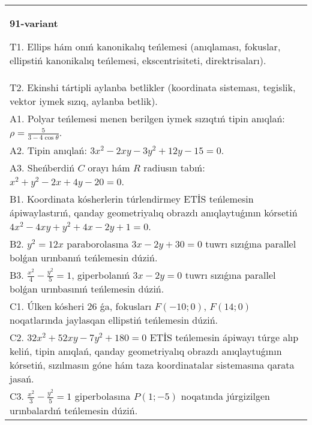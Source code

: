 \documentclass{article}
\begin{document}
\begin{tabular}{m{17cm}}
\textbf{91-variant}
\newline

T1. Ellips hám onıń kanonikalıq teńlemesi (anıqlaması, fokuslar, ellipstiń kanonikalıq teńlemesi, ekscentrisiteti, direktrisaları).\\

T2. Ekinshi tártipli aylanba betlikler (koordinata sisteması, tegislik, vektor iymek sızıq, aylanba betlik).\\

A1. Polyar teńlemesi menen berilgen iymek sızıqtıń tipin anıqlań: $\rho=\frac{5}{3-4\cos\theta}$.\\

A2. Tipin anıqlań: $3 x^{2}-2 xy-3 y^{2}+12 y-15=0$.\\

A3. Sheńberdiń $C$ orayı hám $R$ radiusın tabıń: $x^2+y^2-2 x+4 y-20=0$.\\

B1. Koordinata kósherlerin túrlendirmey ETİS teńlemesin ápiwaylastırıń, qanday geometriyalıq obrazdı anıqlaytuǵının kórsetiń $4x^{2} - 4xy + y^{2} + 4x - 2y + 1 = 0$.  \\

B2. $y^{2} = 12x$ paraborolasına $3x - 2y + 30 = 0$ tuwrı sızıǵına parallel bolǵan urınbanıń teńlemesin dúziń.  \\

B3. $\frac{x^{2}}{4} - \frac{y^{2}}{5} = 1$, giperbolanıń $3x - 2y = 0$ tuwrı sızıǵına parallel bolǵan urınbasınıń teńlemesin dúziń.  \\

C1. Úlken kósheri 26 ǵa, fokusları $F( - 10;0)$, $F(14;0)$ noqatlarında jaylasqan ellipstiń teńlemesin dúziń.  \\

C2. $32x^{2} + 52xy - 7y^{2} + 180 = 0$ ETİS teńlemesin ápiwayı túrge alıp keliń, tipin anıqlań, qanday geometriyalıq obrazdı anıqlaytuǵının kórsetiń, sızılmasın góne hám taza koordinatalar sistemasına qarata jasań.  \\

C3. $\frac{x^{2}}{3} - \frac{y^{2}}{5} = 1$ giperbolasına $P(1; - 5)$ noqatında júrgizilgen urınbalardıń teńlemesin dúziń.\\

\end{tabular}
\vspace{1cm}
\end{document}
